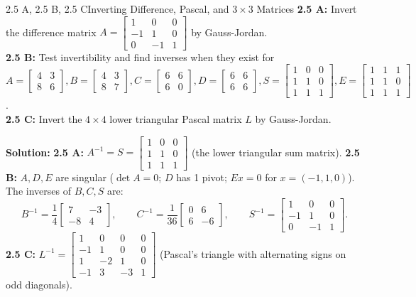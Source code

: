 \documentclass[11pt,a4paper,openany,oneside]{book}
\def\vect#1{#1}%
\def\mathbf#1{#1}%
\newcommand{\vect}[1]{\mathbf{#1}}
\numberwithin{equation}{chapter}
\begin{document}
\begin{example}{2.5 A, 2.5 B, 2.5 C}{Inverting Difference, Pascal, and $3\times 3$ Matrices}
\textbf{2.5 A:} Invert the difference matrix $A = \begin{bmatrix}1&0&0\\-1&1&0\\0&-1&1\end{bmatrix}$ by Gauss-Jordan.\\
\textbf{2.5 B:} Test invertibility and find inverses when they exist for $A=\begin{bmatrix}4&3\\8&6\end{bmatrix}, B=\begin{bmatrix}4&3\\8&7\end{bmatrix}, C=\begin{bmatrix}6&6\\6&0\end{bmatrix}, D=\begin{bmatrix}6&6\\6&6\end{bmatrix}, S=\begin{bmatrix}1&0&0\\1&1&0\\1&1&1\end{bmatrix}, E=\begin{bmatrix}1&1&1\\1&1&0\\1&1&1\end{bmatrix}$.\\
\textbf{2.5 C:} Invert the $4\times 4$ lower triangular Pascal matrix $L$ by Gauss-Jordan.
\end{example}
\textbf{Solution:}
\textbf{2.5 A:} $A^{-1} = S = \begin{bmatrix}1&0&0\\1&1&0\\1&1&1\end{bmatrix}$ (the lower triangular sum matrix).
\textbf{2.5 B:} $A, D, E$ are singular ($\det A = 0$; $D$ has 1 pivot; $E\vect{x}=\vect{0}$ for $\vect{x}=(-1,1,0)$). The inverses of $B, C, S$ are:
\[
B^{-1} = \frac{1}{4}\begin{bmatrix}7 & -3\\-8 & 4\end{bmatrix}, \qquad C^{-1} = \frac{1}{36}\begin{bmatrix}0 & 6\\6 & -6\end{bmatrix}, \qquad S^{-1} = \begin{bmatrix}1 & 0 & 0\\-1 & 1 & 0\\0 & -1 & 1\end{bmatrix}.
\]
\textbf{2.5 C:} $L^{-1} = \begin{bmatrix}1&0&0&0\\-1&1&0&0\\1&-2&1&0\\-1&3&-3&1\end{bmatrix}$ (Pascal's triangle with alternating signs on odd diagonals).
\end{document}

